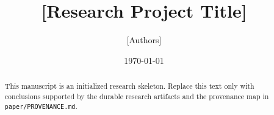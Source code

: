 \documentclass[11pt]{article}
\title{[Research Project Title]}
\author{[Authors]}
\date{\today}
\theoremstyle{definition}
\theoremstyle{remark}
\begin{document}
\maketitle

\begin{abstract}
This manuscript is an initialized research skeleton. Replace this text only
with conclusions supported by the durable research artifacts and the
provenance map in \texttt{paper/PROVENANCE.md}.
\end{abstract}











\appendix

\end{document}
